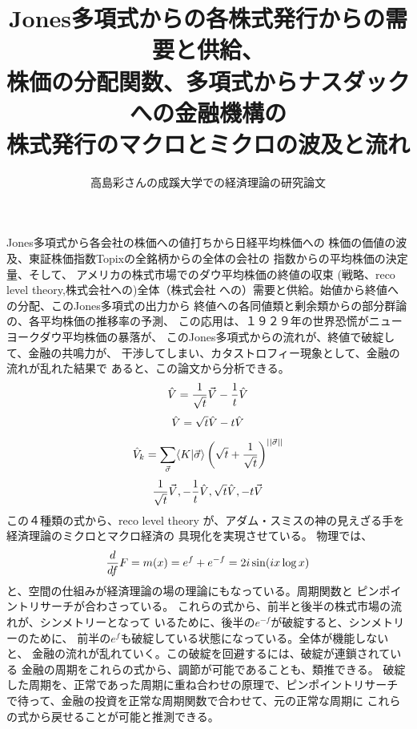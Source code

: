 \documentclass{jsarticle}
\begin{document}
\title{Jones多項式からの各株式発行からの需要と供給、\\
株価の分配関数、多項式からナスダックへの金融機構の \\
株式発行のマクロとミクロの波及と流れ}
\author{高島彩さんの成蹊大学での経済理論の研究論文}
\date{}
\maketitle

   Jones多項式から各会社の株価への値打ちから日経平均株価への
   株価の価値の波及、東証株価指数Topixの全銘柄からの全体の会社の
   指数からの平均株価の決定量、そして、
   アメリカの株式市場でのダウ平均株価の終値の収束
   (戦略、reco level theory,株式会社への)全体（株式会社
   への）需要と供給。始値から終値への分配、このJones多項式の出力から
   終値への各同値類と剰余類からの部分群論の、各平均株価の推移率の予測、
   この応用は、１９２９年の世界恐慌がニューヨークダウ平均株価の暴落が、
   このJones多項式からの流れが、終値で破綻して、金融の共鳴力が、
   干渉してしまい、カタストロフィー現象として、金融の流れが乱れた結果で
   あると、この論文から分析できる。
   $$ \Hat{V} = {1 \over \sqrt{t}} \vec{V} - {1 \over t}\Hat{V} $$
   $$ \Hat{V} = \sqrt{t}\Hat{V} - t \Hat{V} $$
   $$ \Hat{V}_k = \sum_{\vec{\sigma}} \langle K| \vec{\sigma}\rangle
   \left(\sqrt{t} + {1 \over \sqrt{t}} \right)^{||\vec{\sigma}||} $$
   $$ {1 \over \sqrt{t}}\vec{V}, -{1 \over t}\Hat{V},\\ 
   \sqrt{t}\Hat{V}, -t \vec{V} $$
   この４種類の式から、reco level theory
   が、アダム・スミスの神の見えざる手を経済理論のミクロとマクロ経済の
   具現化を実現させている。
   物理では、$$ {d \over df}F = m(x) = e^f + e^{-f} = 2 i \sin (i x \log x) $$
   と、空間の仕組みが経済理論の場の理論にもなっている。周期関数と
   ピンポイントリサーチが合わさっている。
   これらの式から、前半と後半の株式市場の流れが、シンメトリーとなって
   いるために、後半の$ e^{-f} $が破綻すると、シンメトリーのために、
   前半の$ e^f $も破綻している状態になっている。全体が機能しないと、
   金融の流れが乱れていく。この破綻を回避するには、破綻が連鎖されている
   金融の周期をこれらの式から、調節が可能であることも、類推できる。
   破綻した周期を、正常であった周期に重ね合わせの原理で、ピンポイントリサーチ
   で待って、金融の投資を正常な周期関数で合わせて、元の正常な周期に
   これらの式から戻せることが可能と推測できる。
\end{document}
